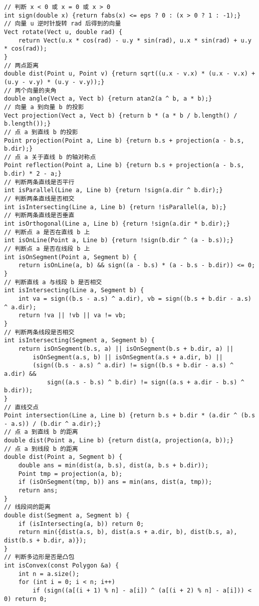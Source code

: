 \begin{verbatim}
// 判断 x < 0 或 x = 0 或 x > 0
int sign(double x) {return fabs(x) <= eps ? 0 : (x > 0 ? 1 : -1);}
// 向量 u 逆时针旋转 rad 后得到的向量
Vect rotate(Vect u, double rad) {
    return Vect(u.x * cos(rad) - u.y * sin(rad), u.x * sin(rad) + u.y * cos(rad));
}
// 两点距离
double dist(Point u, Point v) {return sqrt((u.x - v.x) * (u.x - v.x) + (u.y - v.y) * (u.y - v.y));}
// 两个向量的夹角
double angle(Vect a, Vect b) {return atan2(a ^ b, a * b);}
// 向量 a 到向量 b 的投影
Vect projection(Vect a, Vect b) {return b * (a * b / b.length() / b.length());}
// 点 a 到直线 b 的投影
Point projection(Point a, Line b) {return b.s + projection(a - b.s, b.dir);}
// 点 a 关于直线 b 的轴对称点
Point reflection(Point a, Line b) {return b.s + projection(a - b.s, b.dir) * 2 - a;}
// 判断两条直线是否平行
int isParallel(Line a, Line b) {return !sign(a.dir ^ b.dir);}
// 判断两条直线是否相交
int isIntersecting(Line a, Line b) {return !isParallel(a, b);}
// 判断两条直线是否垂直
int isOrthogonal(Line a, Line b) {return !sign(a.dir * b.dir);}
// 判断点 a 是否在直线 b 上
int isOnLine(Point a, Line b) {return !sign(b.dir ^ (a - b.s));}
// 判断点 a 是否在线段 b 上
int isOnSegment(Point a, Segment b) {
    return isOnLine(a, b) && sign((a - b.s) * (a - b.s - b.dir)) <= 0;
}
// 判断直线 a 与线段 b 是否相交
int isIntersecting(Line a, Segment b) {
    int va = sign((b.s - a.s) ^ a.dir), vb = sign((b.s + b.dir - a.s) ^ a.dir);
    return !va || !vb || va != vb;
}
// 判断两条线段是否相交
int isIntersecting(Segment a, Segment b) {
    return isOnSegment(b.s, a) || isOnSegment(b.s + b.dir, a) ||
        isOnSegment(a.s, b) || isOnSegment(a.s + a.dir, b) ||
        (sign((b.s - a.s) ^ a.dir) != sign((b.s + b.dir - a.s) ^ a.dir) &&
            sign((a.s - b.s) ^ b.dir) != sign((a.s + a.dir - b.s) ^ b.dir));
}
// 直线交点
Point intersection(Line a, Line b) {return b.s + b.dir * (a.dir ^ (b.s - a.s)) / (b.dir ^ a.dir);}
// 点 a 到直线 b 的距离
double dist(Point a, Line b) {return dist(a, projection(a, b));}
// 点 a 到线段 b 的距离
double dist(Point a, Segment b) {
    double ans = min(dist(a, b.s), dist(a, b.s + b.dir));
    Point tmp = projection(a, b);
    if (isOnSegment(tmp, b)) ans = min(ans, dist(a, tmp));
    return ans;
}
// 线段间的距离
double dist(Segment a, Segment b) {
    if (isIntersecting(a, b)) return 0;
    return min({dist(a.s, b), dist(a.s + a.dir, b), dist(b.s, a), dist(b.s + b.dir, a)});
}
// 判断多边形是否是凸包
int isConvex(const Polygon &a) {
    int n = a.size();
    for (int i = 0; i < n; i++)
        if (sign((a[(i + 1) % n] - a[i]) ^ (a[(i + 2) % n] - a[i])) < 0) return 0;

\end{verbatim}
